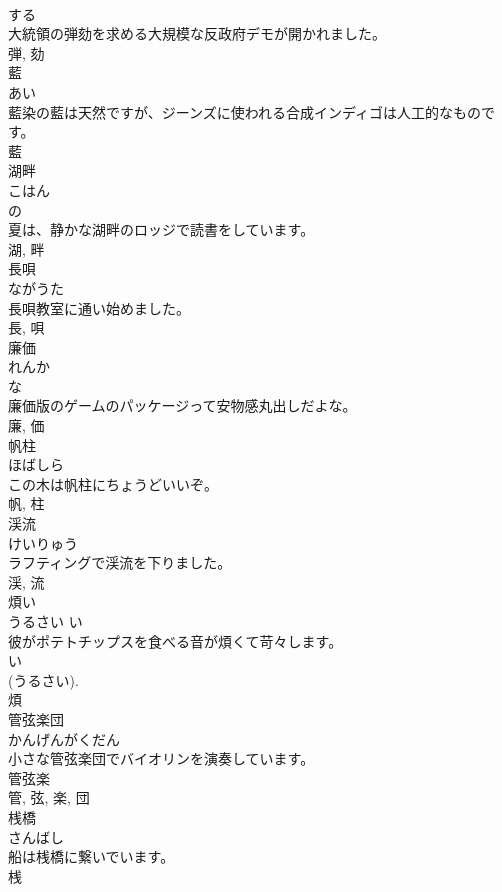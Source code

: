 \documentclass[8pt]{extreport}
\begin{document}
\begin{CJK}{UTF8}{min}
\\	する 
\\	大統領の弾劾を求める大規模な反政府デモが開かれました。	
\\	弾, 劾	
\\	藍	
\\	あい	
\\	藍染の藍は天然ですが、ジーンズに使われる合成インディゴは人工的なものです。	
\\	藍	
\\	湖畔	
\\	こはん	
\\	の 
\\	夏は、静かな湖畔のロッジで読書をしています。	
\\	湖, 畔	
\\	長唄	
\\	ながうた	
\\	長唄教室に通い始めました。	
\\	長, 唄	
\\	廉価	
\\	れんか	
\\	な 
\\	廉価版のゲームのパッケージって安物感丸出しだよな。	
\\	廉, 価	
\\	帆柱	
\\	ほばしら	
\\	この木は帆柱にちょうどいいぞ。	
\\	帆, 柱	
\\	渓流	
\\	けいりゅう	
\\	ラフティングで渓流を下りました。	
\\	渓, 流	
\\	煩い	
\\	うるさい	い 
\\	彼がポテトチップスを食べる音が煩くて苛々します。	
\\	い 
\\	(うるさい). 
\\	煩	
\\	管弦楽団	
\\	かんげんがくだん	
\\	小さな管弦楽団でバイオリンを演奏しています。	
\\	管弦楽 
\\	管, 弦, 楽, 団	
\\	桟橋	
\\	さんばし	
\\	船は桟橋に繋いでいます。	
\\	桟 

\end{CJK}
\end{document}
